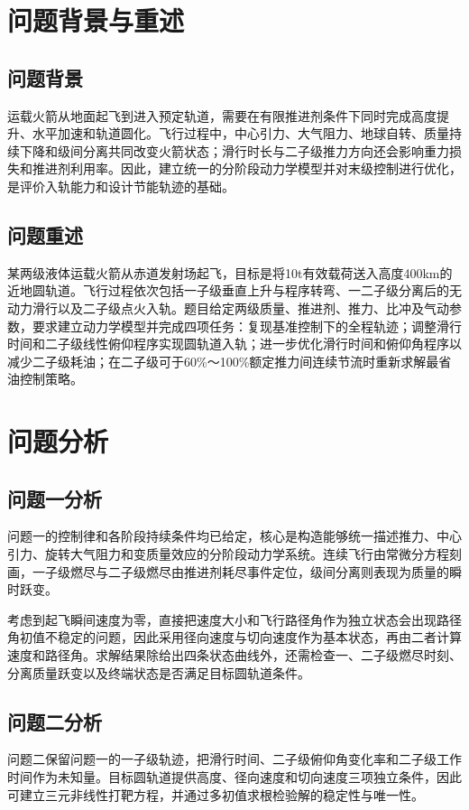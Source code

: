 \documentclass{JXUSTmodeling}
\begin{document}
\begin{abstract}

\end{abstract}
\section{问题背景与重述}
\label{sec:1}
\subsection{问题背景}
\label{sub:1.1}
运载火箭从地面起飞到进入预定轨道，需要在有限推进剂条件下同时完成高度提升、水平加速和轨道圆化。飞行过程中，中心引力、大气阻力、地球自转、质量持续下降和级间分离共同改变火箭状态；滑行时长与二子级推力方向还会影响重力损失和推进剂利用率。因此，建立统一的分阶段动力学模型并对末级控制进行优化，是评价入轨能力和设计节能轨迹的基础。
\subsection{问题重述}
\label{sub:1.2}
某两级液体运载火箭从赤道发射场起飞，目标是将10\si{t}有效载荷送入高度400\si{km}的近地圆轨道。飞行过程依次包括一子级垂直上升与程序转弯、一二子级分离后的无动力滑行以及二子级点火入轨。题目给定两级质量、推进剂、推力、比冲及气动参数，要求建立动力学模型并完成四项任务：复现基准控制下的全程轨迹；调整滑行时间和二子级线性俯仰程序实现圆轨道入轨；进一步优化滑行时间和俯仰角程序以减少二子级耗油；在二子级可于60\%～100\%额定推力间连续节流时重新求解最省油控制策略。
\section{问题分析}
\label{sec:2}
\subsection{问题一分析}
\label{sub:2.1}
问题一的控制律和各阶段持续条件均已给定，核心是构造能够统一描述推力、中心引力、旋转大气阻力和变质量效应的分阶段动力学系统。连续飞行由常微分方程刻画，一子级燃尽与二子级燃尽由推进剂耗尽事件定位，级间分离则表现为质量的瞬时跃变。

考虑到起飞瞬间速度为零，直接把速度大小和飞行路径角作为独立状态会出现路径角初值不稳定的问题，因此采用径向速度与切向速度作为基本状态，再由二者计算速度和路径角。求解结果除给出四条状态曲线外，还需检查一、二子级燃尽时刻、分离质量跃变以及终端状态是否满足目标圆轨道条件。
\subsection{问题二分析}
\label{sub:2.3}
问题二保留问题一的一子级轨迹，把滑行时间、二子级俯仰角变化率和二子级工作时间作为未知量。目标圆轨道提供高度、径向速度和切向速度三项独立条件，因此可建立三元非线性打靶方程，并通过多初值求根检验解的稳定性与唯一性。
\end{document}
